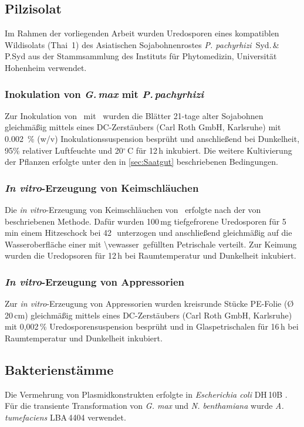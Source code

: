 \subsection{Pilzisolat}
Im Rahmen der vorliegenden Arbeit wurden Uredosporen eines kompatiblen Wildisolats (Thai~1) des Asiatischen Sojabohnenrostes \textit{ P. pachyrhizi} \,Syd.\,\&\,P.Syd aus der Stammsammlung des Instituts für Phytomedizin, Universität Hohenheim verwendet.
\subsubsection{Inokulation von \textit{G.\,max} mit \textit{P.\,pachyrhizi}} 
Zur Inokulation von \Gmax\ mit \Ppach\ wurden die Blätter 21-tage alter Sojabohnen gleichmäßig mittels eines DC-Zerstäubers (Carl Roth GmbH, Karlsruhe) mit \SI{0,002}{\%} (w/v) Inokulationssuspension besprüht und anschließend bei Dunkelheit, 95\% relativer Luftfeuchte und 20$^\circ$\,C für 12\,h inkubiert. Die weitere Kultivierung der Pflanzen erfolgte unter den in \ref{sec:Saatgut} beschriebenen Bedingungen.
\subsubsection{\textit{In vitro}-Erzeugung von Keimschläuchen}\label{sec:Keimschlauch}
Die \textit{in vitro}-Erzeugung von Keimschläuchen von \Ppach\ erfolgte nach der von \citet{PosadaBuitrago.2005} beschriebenen Methode. Dafür wurden 100\,mg tiefgefrorene Uredosporen für 5\,min einem Hitzeschock bei 42\,\celcius\ unterzogen und anschließend gleichmäßig auf die Wasseroberfläche einer mit \acs{\vewasser}\ gefüllten Petrischale verteilt. Zur Keimung wurden die Uredopsoren für 12\,h bei Raumtemperatur und Dunkelheit inkubiert.
\subsubsection{\textit{In vitro}-Erzeugung von  Appressorien }\label{sec:appressorien}
Zur \textit{in vitro}-Erzeugung von Appressorien wurden kreisrunde Stücke \acs{PE}-Folie (\O\,20\,cm)  gleichmäßig mittels eines DC-Zerstäubers (Carl Roth GmbH, Karlsruhe) mit 0,002\,\% Uredosporensuspension besprüht und in Glaspetrischalen für 16\,h bei Raumtemperatur und Dunkelheit inkubiert. 
\subsection{Bakterienstämme}
Die Vermehrung von Plasmidkonstrukten erfolgte in \textit{Escherichia coli} DH\,10B \citep{Grant.1990}.
Für die transiente Transformation von \textit{G. max} und \textit{N. benthamiana} wurde \textit{A. tumefaciens } LBA\,4404 \citep{Ooms.1981} verwendet. 
